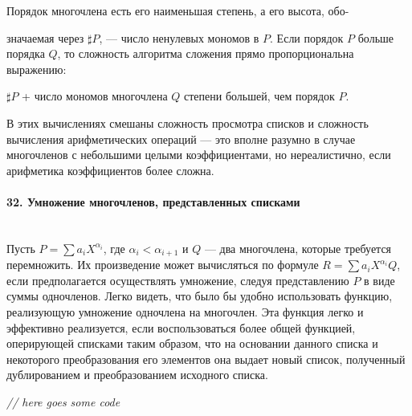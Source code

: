 \documentclass{../../template/mai_book}
\begin{document}

Порядок многочлена есть его наименьшая степень, а его высота, обо- \linebreak

\newpage


\noindent
значаемая через $\sharp P$, — число ненулевых мономов в $P$. Если порядок $P$ больше порядка $Q$, то сложность алгоритма сложения прямо пропорциональна выражению:

\begin{center}
$\sharp P$ + число мономов многочлена $Q$ степени большей, чем порядок $P$.
\end{center}

\noindent
В этих вычислениях смешаны сложность просмотра списков и сложность вычисления арифметических операций — это вполне разумно в случае многочленов с небольшими целыми коэффициентами, но нереалистично, если арифметика коэффициентов более сложна.

\paragraph{32. Умножение многочленов, представленных списками} \mbox{}\\

Пусть $P = \sum a_i X^{\alpha_i}$, где $\alpha_i < \alpha_{i + 1}$ и $Q$ — два многочлена, которые требуется перемножить. Их произведение может вычисляться по формуле $R = \sum a_i X^{\alpha_i}Q$, если предполагается осуществлять умножение, следуя представлению $P$ в виде суммы одночленов. Легко видеть, что было бы удобно использовать функцию, реализующую умножение одночлена на многочлен. Эта функция легко и эффективно  реализуется, если воспользоваться более общей функцией, оперирующей списками таким образом, что на основании данного списка и некоторого преобразования его элементов она выдает новый список, полученный дублированием и преобразованием исходного списка. \newline

\textit{// here goes some code}
\end{document}
